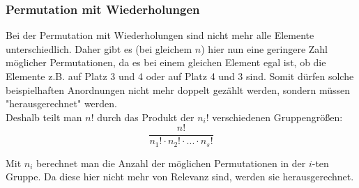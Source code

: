 \documentclass[a4paper]{article}
\begin{document}
\noindent {}

\subsubsection{Permutation mit Wiederholungen}\label{sec:perm-mit}
Bei der Permutation mit Wiederholungen sind nicht mehr alle Elemente unterschiedlich. Daher gibt es (bei gleichem $n$) hier nun eine geringere Zahl möglicher Permutationen, da es bei einem gleichen Element egal ist, ob die Elemente z.B. auf Platz 3 und 4 oder auf Platz 4 und 3 sind. Somit dürfen solche beispielhaften Anordnungen nicht mehr doppelt gezählt werden, sondern müssen "herausgerechnet" werden.\\
Deshalb teilt man $n!$ durch das Produkt der $n_i!$ verschiedenen Gruppengrößen:
$$\frac{n!}{n_1!\cdot n_2!\cdot...\cdot n_s!}$$

\noindent Mit $n_i$ berechnet man die Anzahl der möglichen Permutationen in der $i$-ten Gruppe. Da diese hier nicht mehr von Relevanz sind, werden sie herausgerechnet.
\end{document}
